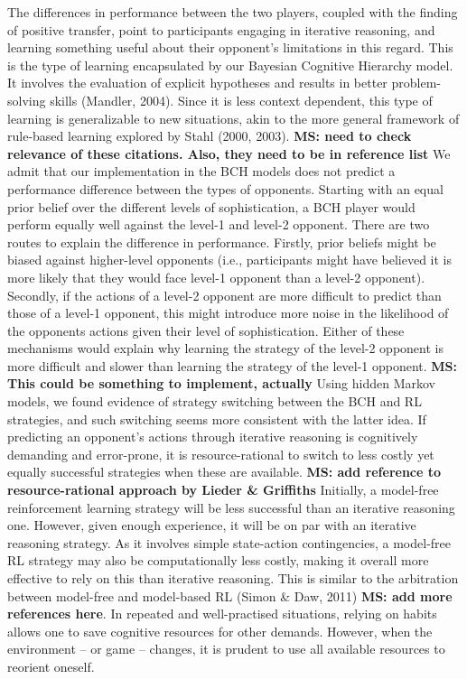 \documentclass[
  english,
  man,floatsintext]{apa6}
\begin{document}
The differences in performance between the two players, coupled with the finding of positive transfer, point to participants engaging in iterative reasoning, and learning something useful about their opponent's limitations in this regard. This is the type of learning encapsulated by our Bayesian Cognitive Hierarchy model. It involves the evaluation of explicit hypotheses and results in better problem-solving skills (Mandler, 2004). Since it is less context dependent, this type of learning is generalizable to new situations, akin to the more general framework of rule-based learning explored by Stahl (2000, 2003). \textbf{MS: need to check relevance of these citations. Also, they need to be in reference list } We admit that our implementation in the BCH models does not predict a performance difference between the types of opponents. Starting with an equal prior belief over the different levels of sophistication, a BCH player would perform equally well against the level-1 and level-2 opponent. There are two routes to explain the difference in performance. Firstly, prior beliefs might be biased against higher-level opponents (i.e., participants might have believed it is more likely that they would face level-1 opponent than a level-2 opponent). Secondly, if the actions of a level-2 opponent are more difficult to predict than those of a level-1 opponent, this might introduce more noise in the likelihood of the opponents actions given their level of sophistication. Either of these mechanisms would explain why learning the strategy of the level-2 opponent is more difficult and slower than learning the strategy of the level-1 opponent. \textbf{MS: This could be something to implement, actually} Using hidden Markov models, we found evidence of strategy switching between the BCH and RL strategies, and such switching seems more consistent with the latter idea. If predicting an opponent's actions through iterative reasoning is cognitively demanding and error-prone, it is resource-rational to switch to less costly yet equally successful strategies when these are available. \textbf{MS: add reference to resource-rational approach by Lieder \& Griffiths } Initially, a model-free reinforcement learning strategy will be less successful than an iterative reasoning one. However, given enough experience, it will be on par with an iterative reasoning strategy. As it involves simple state-action contingencies, a model-free RL strategy may also be computationally less costly, making it overall more effective to rely on this than iterative reasoning. This is similar to the arbitration between model-free and model-based RL (Simon \& Daw, 2011) \textbf{MS: add more references here}. In repeated and well-practised situations, relying on habits allows one to save cognitive resources for other demands. However, when the environment -- or game -- changes, it is prudent to use all available resources to reorient oneself.
\end{document}
